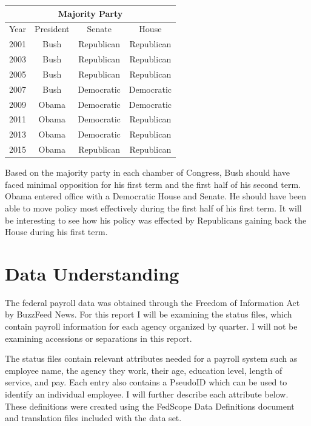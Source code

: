 \documentclass{article}
\begin{document}
        \begin{center}
            \begin{tabular}{ |c|c|c|c| }
                \hline
                \multicolumn{4}{|c|}{Majority Party} \\
                \hline
                Year & President & Senate & House \\
                \hline
                2001 & Bush & Republican & Republican \\
                2003 & Bush & Republican & Republican \\
                2005 & Bush & Republican & Republican \\
                2007 & Bush & Democratic & Democratic \\
                2009 & Obama & Democratic & Democratic \\
                2011 & Obama & Democratic & Republican \\
                2013 & Obama & Democratic & Republican \\
                2015 & Obama & Republican & Republican \\
                \hline
            \end{tabular}
        \end{center}

    Based on the majority party in each chamber of Congress, Bush should have faced minimal opposition for his first term and the first half of his second term. Obama entered office with a Democratic House and Senate. He should have been able to move policy most effectively during the first half of his first term. It will be interesting to see how his policy was effected by Republicans gaining back the House during his first term.

\section{Data Understanding}
The federal payroll data was obtained through the Freedom of Information Act by BuzzFeed News. For this report I will be examining the status files, which contain payroll information for each agency organized by quarter. I will not be examining accessions or separations in this report.
\par
The status files contain relevant attributes needed for a payroll system such as employee name, the agency they work, their age, education level, length of service, and pay. Each entry also contains a PseudoID which can be used to identify an individual employee. I will further describe each attribute below. These definitions were created using the FedScope Data Definitions document and translation files included with the data set.\cite{datadefs}
\end{document}
